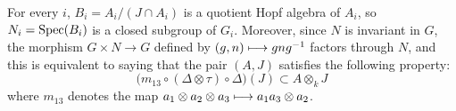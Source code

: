 For every $i$, $B_i=A_i/(J\cap A_i)$ is a quotient Hopf algebra of $A_i$, so $N_i=\operatorname{Spec}(B_i)$ is a closed subgroup of $G_i$. Moreover, since $N$ is invariant in $G$, the morphism $G\times N\to G$ defined by $(g,n)\longmapsto gng^{-1}$ factors through $N$, and this is equivalent to saying that the pair $(A,J)$ satisfies the following property:
\[
\bigl(m_{13}\circ(\Delta\otimes\tau)\circ\Delta\bigr)(J)\subset A\otimes_k J
\]
where $m_{13}$ denotes the map $a_1\otimes a_2\otimes a_3\longmapsto a_1a_3\otimes a_2$.
